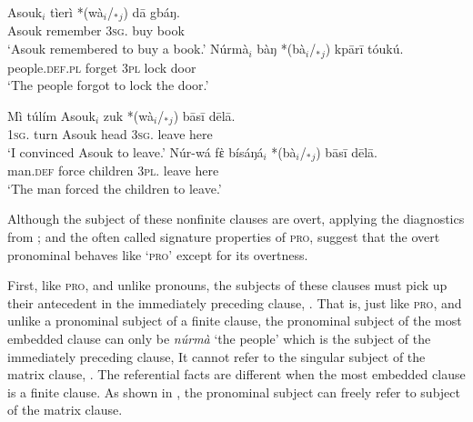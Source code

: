\documentclass[output=paper,colorlinks,citecolor=brown]{langscibook}
\begin{document}
\ea%
    \label{ex:sulemana:16}
    \ea%
    \label{ex:sulemana:16a}
    \gll    Asouk$_i$ tìerì *(wà$_i$/$_*${}$_j$) dā gbáŋ.\\
            Asouk remember  \textsc{3sg}. buy book\\
    \glt    `Asouk remembered to buy a book.'
    \ex%
    \label{ex:sulemana:16b}
    \gll    Núrmà$_i$ bàŋ *(bà$_i$/$_*${}$_j$) kpārī tóukú.\\
            people.\textsc{def.pl} forget \textsc{3pl} lock door\\
    \glt    `The people forgot to lock the door.' 
    \z
\z

\ea%
    \label{ex:sulemana:17}
    \ea%
    \label{ex:sulemana:17a}
    \gll    Mì túlím Asouk$_i$ zuk *(wà$_i$/$_*${}$_j$) bāsī dēlā.\\
            \textsc{1sg}. turn Asouk head \textsc{3sg}. leave here\\
    \glt    `I convinced Asouk to leave.'
    \ex%
    \label{ex:sulemana:17b}
    \gll    Núr-wá fὲ  bísáŋá$_i$  *(bà$_i$/$_*${}$_j$) bāsī dēlā. \\
            man.\textsc{def} force children \textsc{3pl}. leave here\\
    \glt    `The man forced the children to leave.' 
    \z
\z

Although the subject of these nonfinite clauses are overt, applying the diagnostics from  \citet{Hornstein1999, Landau2013}; and \citet{Williams1980} the often called  signature properties of \textsc{pro}, suggest that the overt pronominal behaves like `\textsc{pro}' except for its overtness.

First, like \textsc{pro}, and unlike pronouns, the subjects of these clauses must pick up their antecedent in the immediately preceding clause, . That is, just like \textsc{pro}, and unlike a pronominal subject of a finite clause, the pronominal subject of the most embedded clause can only  be {\it{núrmà}} `the people' which is the subject of the immediately preceding clause, It cannot refer to the singular subject of the matrix clause, . The referential facts are different when the most embedded clause is a finite clause. As shown in , the pronominal subject can freely refer to subject of the matrix clause. 
\end{document}
